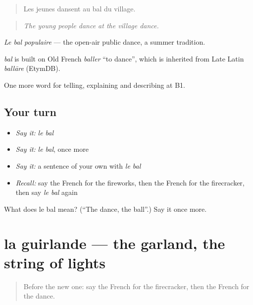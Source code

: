 \begin{quote}
Les jeunes dansent au bal du village.
\end{quote}

\begin{quote}
\emph{The young people dance at the village dance.}
\end{quote}

\emph{Le bal populaire} — the open-air public dance, a summer tradition.

\begin{cousinweb}
\emph{bal} is built on Old French \emph{baller} \textquotedblleft{}to dance\textquotedblright{}, which is inherited from Late Latin \emph{ballāre} (EtymDB).
\end{cousinweb}

\begin{grammarlens}[title={What you've built}]
One more word for telling, explaining and describing at B1.
\end{grammarlens}

\subsection*{Your turn}
\begin{itemize}
\raggedright
  \item \emph{Say it:} \emph{le bal}
  \item \emph{Say it:} \emph{le bal}, once more
  \item \emph{Say it:} a sentence of your own with \emph{le bal}
  \item \emph{Recall:} say the French for the fireworks, then the French for the firecracker, then say \emph{le bal} again
\end{itemize}

\begin{tcolorbox}[breakable,colback=teal!4,colframe=teal!35!black,title={Before you move on}]
What does le bal mean? (\textquotedblleft{}The dance, the ball\textquotedblright{}.) Say it once more.
\end{tcolorbox}
\section[la guirlande]{la guirlande — the garland, the string of lights}

\label{lesson:FR-C318-guirlande}



\begin{quote}
Before the new one: say the French for the firecracker, then the French for the dance.
\end{quote}

